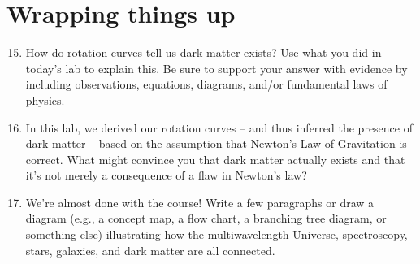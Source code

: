 \documentclass[11pt]{article}%
\begin{document}
\section{Wrapping things up}
\begin{enumerate}
\setcounter{enumi}{14}

\item How do rotation curves tell us dark matter exists? Use what you did in today's lab to explain this. Be sure to support your answer with evidence by including observations, equations, diagrams, and/or fundamental laws of physics.
 

\item In this lab, we derived our rotation curves -- and thus inferred the presence of dark matter -- based on the assumption that Newton's Law of Gravitation is correct. What might convince you that dark matter actually exists and that it's not merely a consequence of a flaw in Newton's law? 

\item We're almost done with the course! Write a few paragraphs or draw a diagram (e.g., a concept map, a flow chart, a branching tree diagram, or something else) illustrating how the multiwavelength Universe, spectroscopy, stars, galaxies, and dark matter are all connected. 


\end{enumerate}
\end{document}
